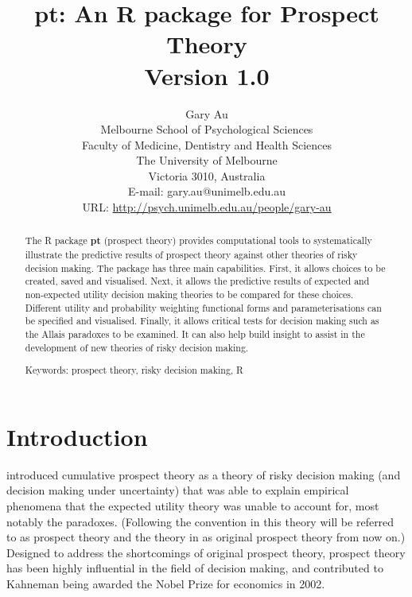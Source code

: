 \documentclass{article}\usepackage[]{graphicx}\usepackage[]{color}
\begin{document}

\title{pt: An R package for Prospect Theory\\Version 1.0}

\author{Gary Au\\
  Melbourne School of Psychological Sciences\\
  Faculty of Medicine, Dentistry and Health Sciences\\
  The University of Melbourne\\
  Victoria 3010, Australia\\
  E-mail: gary.au@unimelb.edu.au\\
  URL: \url{http://psych.unimelb.edu.au/people/gary-au}}
\maketitle

\begin{abstract}
The R package {\bf pt} (prospect theory) provides
computational tools to systematically illustrate the predictive results of prospect theory against other theories of risky decision making. 
The package has three main capabilities. First, it allows choices to be created, saved and visualised. Next, it allows the predictive results of expected and non-expected utility decision making theories to be compared for these choices. Different utility and probability weighting functional forms and parameterisations can be specified and visualised. Finally, it allows critical tests for decision making such as the Allais paradoxes to be examined. It can also help build insight to assist in the development of new theories of risky decision making.

Keywords: prospect theory, risky decision making, R
\end{abstract}



\section{Introduction}

\citet*{Tversky_Kahneman_1992} introduced cumulative prospect theory as a theory of risky decision making (and decision making under uncertainty)
that was able to explain empirical  phenomena that the expected utility theory \citep*{Bernoulli_1738_1954, von_Neumann_Morgenstern_1947} was unable to account for, most notably the \cite{Allais_1953, Allais_1979} paradoxes. (Following the convention in \cite{Wakker_2010} this theory will be referred to as prospect theory and the theory in \cite{Kahneman_Tversky_1979} as original prospect theory from now on.) Designed to address the shortcomings of original prospect theory, prospect theory has been highly influential in the field of decision making, and contributed to Kahneman being awarded the Nobel Prize for economics in 2002.
\end{document}
